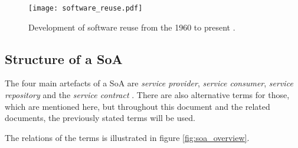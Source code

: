 \begin{figure}[ht]
\centering
\texttt{[image: software\_reuse.pdf]}
\caption{Development of software reuse from the 1960 to present \cite{clements}.}
\label{fig:software_reuse}
\end{figure}


\subsection{Structure of a SoA}
\label{sec:structure_of_soa}
The four main artefacts of a SoA are \emph{service provider}, \emph{service consumer}, \emph{service repository} and the \emph{service contract} \cite{arrowhead} \cite{breivold} \cite{rodrigues2011}. There are also alternative terms for those, which are mentioned here, but throughout this document and the related documents, the previously stated terms will be used.

The relations of the terms is illustrated in figure \ref{fig:soa_overview}.

